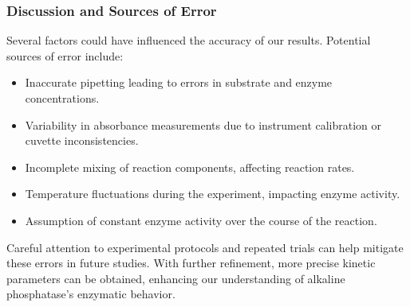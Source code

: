 \documentclass[openany]{book}
\begin{document}
\subsubsection{Discussion and Sources of Error}
Several factors could have influenced the accuracy of our results. Potential sources of error include:
\begin{itemize}
    \item Inaccurate pipetting leading to errors in substrate and enzyme concentrations.
    \item Variability in absorbance measurements due to instrument calibration or cuvette inconsistencies.
    \item Incomplete mixing of reaction components, affecting reaction rates.
    \item Temperature fluctuations during the experiment, impacting enzyme activity.
    \item Assumption of constant enzyme activity over the course of the reaction.
\end{itemize}
Careful attention to experimental protocols and repeated trials can help mitigate these errors in future studies. With further refinement, more precise kinetic parameters can be obtained, enhancing our understanding of alkaline phosphatase's enzymatic behavior.
\end{document}
